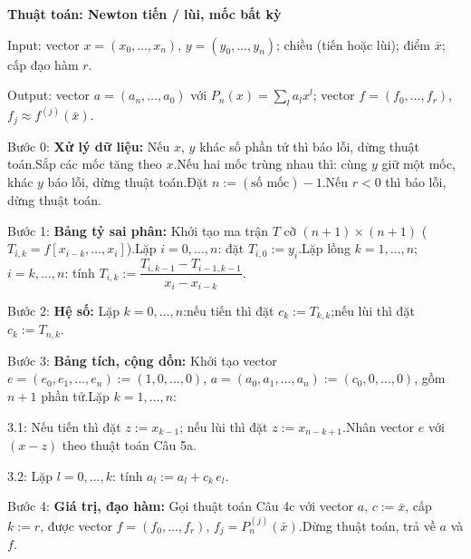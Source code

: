\documentclass[11pt,a4paper]{article}
\newenvironment{thuattoan}[1]
  {\par\medskip\noindent\textbf{Thuật toán: #1}\begin{description}[style=standard,align=left,leftmargin=4.3em,labelwidth=3.9em,labelsep=0.4em,itemsep=1pt,topsep=3pt,font=\normalfont\bfseries]}
  {\end{description}}
\newenvironment{con}
  {\begin{description}[style=standard,align=left,leftmargin=2.1em,labelwidth=1.8em,labelsep=0.3em,itemsep=0pt,topsep=1pt,font=\normalfont]}
  {\end{description}}
\newcommand{\thut}{\newline\hspace*{1.2em}}
\begin{document}
\begin{thuattoan}{Newton tiến / lùi, mốc bất kỳ}
\item[Input:] vector $x=(x_0,\dots,x_n)$, $y=(y_0,\dots,y_n)$; chiều (tiến hoặc lùi); điểm $\bar x$; cấp đạo hàm $r$.
\item[Output:] vector $a=(a_n,\dots,a_0)$ với $P_n(x)=\sum_la_lx^l$; vector $f=(f_0,\dots,f_r)$, $f_j\approx f^{(j)}(\bar x)$.
\item[Bước 0:] \textbf{Xử lý dữ liệu:} Nếu $x$, $y$ khác số phần tử thì báo lỗi, dừng thuật toán.\newline Sắp các mốc tăng theo $x$.\newline Nếu hai mốc trùng nhau thì: cùng $y$ giữ một mốc, khác $y$ báo lỗi, dừng thuật toán.\newline Đặt $n:=(\text{số mốc})-1$.\newline Nếu $r<0$ thì báo lỗi, dừng thuật toán.
\item[Bước 1:] \textbf{Bảng tỷ sai phân:} Khởi tạo ma trận $T$ cỡ $(n+1)\times(n+1)$ ($T_{i,k}=f[x_{i-k},\dots,x_i]$).\newline Lặp $i=0,\dots,n$: đặt $T_{i,0}:=y_i$.\newline Lặp lồng $k=1,\dots,n$; $i=k,\dots,n$: tính $T_{i,k}:=\dfrac{T_{i,k-1}-T_{i-1,k-1}}{x_i-x_{i-k}}$.
\item[Bước 2:] \textbf{Hệ số:} Lặp $k=0,\dots,n$:\thut nếu tiến thì đặt $c_k:=T_{k,k}$;\thut nếu lùi thì đặt $c_k:=T_{n,k}$.
\item[Bước 3:] \textbf{Bảng tích, cộng dồn:} Khởi tạo vector $e=(e_0,e_1,\dots,e_n):=(1,0,\dots,0)$, $a=(a_0,a_1,\dots,a_n):=(c_0,0,\dots,0)$, gồm $n+1$ phần tử.\newline Lặp $k=1,\dots,n$:
  \begin{con}
  \item[3.1:] Nếu tiến thì đặt $z:=x_{k-1}$; nếu lùi thì đặt $z:=x_{n-k+1}$.\newline Nhân vector $e$ với $(x-z)$ theo thuật toán Câu 5a.
  \item[3.2:] Lặp $l=0,\dots,k$: tính $a_l:=a_l+c_k\,e_l$.
  \end{con}
\item[Bước 4:] \textbf{Giá trị, đạo hàm:} Gọi thuật toán Câu 4c với vector $a$, $c:=\bar x$, cấp $k:=r$, được vector $f=(f_0,\dots,f_r)$, $f_j=P_n^{(j)}(\bar x)$.\newline Dừng thuật toán, trả về $a$ và $f$.
\end{thuattoan}
\end{document}
